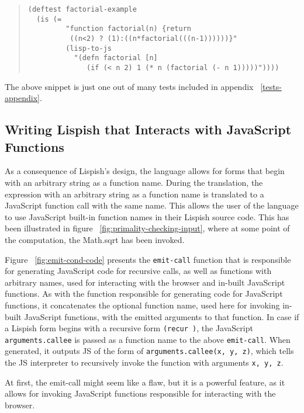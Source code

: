 \begin{quote}
\begin{verbatim}
(deftest factorial-example
  (is (= 
         "function factorial(n) {return 
          ((n<2) ? (1):((n*factorial(((n-1))))))}"
         (lisp-to-js 
           "(defn factorial [n] 
              (if (< n 2) 1 (* n (factorial (- n 1)))))"))))
\end{verbatim}
\end{quote}

The above snippet is just one out of many tests included in appendix ~\ref{tests-appendix}. 

\subsection{Writing Lispish that Interacts with JavaScript Functions}
As a consequence of Lispish's design, the language allows for forms that begin with an arbitrary string as a function name. During the translation, the expression with an arbitrary string as a function name is translated to a JavaScript function call with the same name. This allows the user of the language to use JavaScript built-in function names in their Lispish source code. This has been illustrated in figure ~\ref{fig:primality-checking-input}, where at some point of the computation, the Math.sqrt has been invoked. 



Figure ~\ref{fig:emit-cond-code} presents the \texttt{emit-call} function that is responsible for generating JavaScript code for recursive calls, as well as functions with arbitrary names, used for interacting with the browser and in-built JavaScript functions. 
As with the function responsible for generating code for JavaScript functions, it concatenates the optional function name, used here for invoking in-built JavaScript functions, with the emitted arguments to that function.
In case if a Lispish form begins with a recursive form \texttt{(recur )}, the JavaScript \texttt{arguments.callee} is passed as a function name to the above \texttt{emit-call}.
When generated, it outputs JS of the form of \texttt{arguments.callee(x, y, z)}, which tells the JS interpreter to recursively invoke the function with arguments \texttt{x, y, z}.

At first, the emit-call might seem like a flaw, but it is a powerful feature, as it allows for invoking JavaScript functions responsible for interacting with the browser. 

